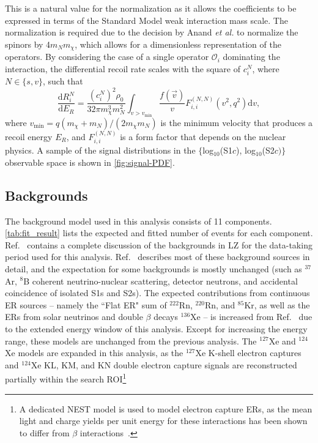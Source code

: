 \documentclass[reprint, showpacs,
preprintnumbers,
amsmath,amssymb,
aps, floatfix,
superscriptaddress,
prd, nofootinbib]{revtex4-1}
\begin{document}
This is a natural value for the normalization as it allows the coefficients to be expressed in terms of the Standard Model weak interaction mass scale.
The normalization is required due to the decision by Anand \textit{et al.} to normalize the spinors by 4$m_N m_\chi$, which allows for a dimensionless representation of the operators. 
By considering the case of a single operator $\mathcal{O}_i$ dominating the interaction, the differential recoil rate scales with the square of $c_i^N$, where $N \in \{s, v\}$, such that
\begin{equation}\label{eq:spectrumReduced}
     \frac{\mathrm{d} R_i^N}{\mathrm{d} E_{R}}=\frac{(c_{i}^{N})^2 \rho_{0}}{32 \pi m_{\chi}^{3} m_{N}^{2}} \int_{v>v_\text{min}} \frac{f(\vec{v})}{v} F_{i, i}^{\left(N, N\right)}\left(v^2, q^{2}\right) \mathrm{d}{v},
\end{equation}
where $v_\text{min} = q(m_\chi + m_N) / (2 m_\chi m_N)$ is the minimum velocity that produces a recoil energy $E_R$, and $F_{i,i}^{(N, N)}$ is a form factor that depends on the nuclear physics. 
A sample of the signal distributions in the $\{$log$_{10}$(S1$c$), log$_{10}$(S2$c)\}$ observable space is shown in \autoref{fig:signal-PDF}.

\subsection{\label{subsec:bg}Backgrounds}
\par
The background model used in this analysis consists of 11 components.
\autoref{tab:fit_result} lists the expected and fitted number of events for each component.
Ref.~\cite{LZ:sr1backgrounds_2022} contains a complete discussion of the backgrounds in LZ for the data-taking period used for this analysis.
Ref.~\cite{LZ:SR1WS_2022} describes most of these background sources in detail, and the expectation for some backgrounds is mostly unchanged (such as ${}^{37}$Ar, ${}^{8}$B coherent neutrino-nuclear scattering, detector neutrons, and accidental coincidence of isolated S1s and S2s). 
The expected contributions from continuous ER sources -- namely the ``Flat ER" sum of ${}^{222}$Rn, ${}^{220}$Rn, and ${}^{85}$Kr, as well as the ERs from solar neutrinos and double $\beta$ decays ${}^{136}$Xe -- is increased from Ref.~\cite{LZ:SR1WS_2022} due to the extended energy window of this analysis. 
Except for increasing the energy range, these models are unchanged from the previous analysis. 
The ${}^{127}$Xe and ${}^{124}$Xe models are expanded in this analysis, as the ${}^{127}$Xe K-shell electron captures and ${}^{124}$Xe KL, KM, and KN double electron capture signals are reconstructed partially within the search ROI\footnote{A dedicated NEST model is used to model electron capture ERs, as the mean light and charge yields per unit energy for these interactions has been shown to differ from $\beta$ interactions~\cite{XELDA_Lshell_EC}.}
\end{document}
